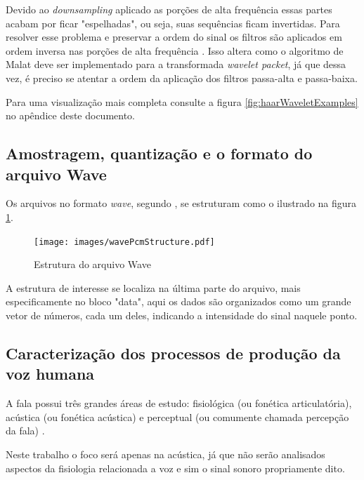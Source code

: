 \begin{myenv}{1.5}
				\par Devido ao \textit{downsampling} aplicado as porções de alta frequência essas partes acabam por ficar "espelhadas", ou seja, suas sequências ficam invertidas. Para resolver  esse problema e preservar a ordem do sinal os filtros são aplicados em ordem inversa nas porções de alta frequência \cite{Jensen_2001}. Isso altera como o algoritmo de Malat deve ser implementado para a transformada \textit{wavelet packet}, já que dessa vez, é preciso se atentar a ordem da aplicação dos filtros passa-alta e passa-baixa.

				
				
				\par Para uma visualização mais completa consulte a figura \ref{fig:haarWaveletExamples} no apêndice deste documento.
			\subsection{Amostragem, quantização e o formato do arquivo Wave}
				\par Os arquivos no formato \textit{wave}, segundo \cite{WAVE2019}, se estruturam como o ilustrado na figura \ref{fig:wavePcmStructure}.
			
				\begin{figure}[h]
					\centering
					\texttt{[image: images/wavePcmStructure.pdf]}
					\caption{Estrutura do arquivo Wave}
					\label{fig:wavePcmStructure}
				\end{figure}
				
				\par A estrutura de interesse se localiza na última parte do arquivo, mais especificamente no bloco "data", aqui os dados são organizados como um grande vetor de números, cada um deles, indicando a intensidade do sinal naquele ponto.
			\subsection{Caracterização dos processos de produção da voz humana}
				\par A fala possui três grandes áreas de estudo: fisiológica (ou fonética articulatória),  acústica  (ou fonética acústica)  e  perceptual  (ou  comumente  chamada percepção  da  fala) \cite{kremer2014eficiencia}.
				\par Neste trabalho o foco será apenas na acústica, já que não serão analisados aspectos da fisiologia relacionada a voz e sim o sinal sonoro propriamente dito.
				

\end{myenv}
